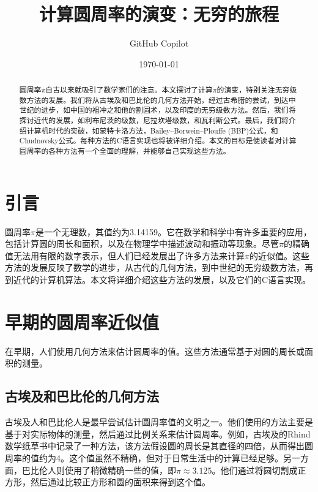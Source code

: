 \documentclass{ctexart}
\begin{document}
\title{计算圆周率的演变：无穷的旅程}
\author{GitHub Copilot}
\date{\today}

\maketitle

\begin{abstract}
    圆周率$\pi$自古以来就吸引了数学家们的注意。本文探讨了计算$\pi$的演变，特别关注无穷级数方法的发展。我们将从古埃及和巴比伦的几何方法开始，经过古希腊的尝试，到达中世纪的进步，如中国的祖冲之和他的割圆术，以及印度的无穷级数方法。然后，我们将探讨近代的发展，如利布尼茨的级数，尼拉坎塔级数，和瓦利斯公式。最后，我们将介绍计算机时代的突破，如蒙特卡洛方法，Bailey–Borwein–Plouffe (BBP)公式，和Chudnovsky公式。每种方法的C语言实现也将被详细介绍。本文的目标是使读者对计算圆周率的各种方法有一个全面的理解，并能够自己实现这些方法。
\end{abstract}

\section{引言}

圆周率$\pi$是一个无理数，其值约为3.14159。它在数学和科学中有许多重要的应用，包括计算圆的周长和面积，以及在物理学中描述波动和振动等现象\cite{beckmann1971history}。尽管$\pi$的精确值无法用有限的数字表示，但人们已经发展出了许多方法来计算$\pi$的近似值。这些方法的发展反映了数学的进步，从古代的几何方法，到中世纪的无穷级数方法，再到近代的计算机算法。本文将详细介绍这些方法的发展，以及它们的C语言实现。

\section{早期的圆周率近似值}

在早期，人们使用几何方法来估计圆周率的值。这些方法通常基于对圆的周长或面积的测量。

\subsection{古埃及和巴比伦的几何方法}

古埃及人和巴比伦人是最早尝试估计圆周率值的文明之一。他们使用的方法主要是基于对实际物体的测量，然后通过比例关系来估计圆周率。例如，古埃及的Rhind数学纸草书中记录了一种方法，该方法假设圆的周长是其直径的四倍，从而得出圆周率的值约为4。这个值虽然不精确，但对于日常生活中的计算已经足够\cite{robins1995rhind}。另一方面，巴比伦人则使用了稍微精确一些的值，即$\pi \approx 3.125$。他们通过将圆切割成正方形，然后通过比较正方形和圆的面积来得到这个值\cite{robson2002words}。
\end{document}

